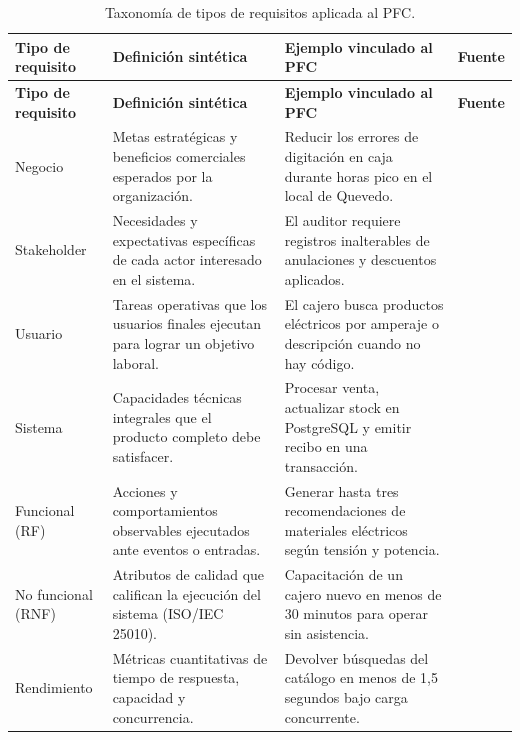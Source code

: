 \documentclass[onecolumn,12pt,a4paper]{IEEEtran}
\begin{document}
	\begin{longtable}{>{\raggedright\arraybackslash}p{2.6cm} >{\raggedright\arraybackslash}p{5.2cm} >{\raggedright\arraybackslash}p{5.2cm} >{\raggedright\arraybackslash}p{2.0cm}}
		\caption{Taxonom\'ia de tipos de requisitos aplicada al PFC.}
		\label{tab:tipos_req}\\
		\toprule
		\textbf{Tipo de requisito} & \textbf{Definici\'on sint\'etica} & \textbf{Ejemplo vinculado al PFC} & \textbf{Fuente} \\
		\midrule
		\endfirsthead
		\toprule
		\textbf{Tipo de requisito} & \textbf{Definici\'on sint\'etica} & \textbf{Ejemplo vinculado al PFC} & \textbf{Fuente} \\
		\midrule
		\endhead
		\bottomrule
		\endfoot
		Negocio & Metas estrat\'egicas y beneficios comerciales esperados por la organizaci\'on. & Reducir los errores de digitaci\'on en caja durante horas pico en el local de Quevedo. & \cite{iso29148,wiegers2013} \\
		\midrule
		Stakeholder & Necesidades y expectativas espec\'ificas de cada actor interesado en el sistema. & El auditor requiere registros inalterables de anulaciones y descuentos aplicados. & \cite{iso29148,pmbok7} \\
		\midrule
		Usuario & Tareas operativas que los usuarios finales ejecutan para lograr un objetivo laboral. & El cajero busca productos el\'ectricos por amperaje o descripci\'on cuando no hay c\'odigo. & \cite{iso29148,ireb2023} \\
		\midrule
		Sistema & Capacidades t\'ecnicas integrales que el producto completo debe satisfacer. & Procesar venta, actualizar stock en PostgreSQL y emitir recibo en una transacci\'on. & \cite{iso29148,iso15288} \\
		\midrule
		Funcional (RF) & Acciones y comportamientos observables ejecutados ante eventos o entradas. & Generar hasta tres recomendaciones de materiales el\'ectricos seg\'un tensi\'on y potencia. & \cite{iso29148,pohl2025,mavin2009} \\
		\midrule
		No funcional (RNF) & Atributos de calidad que califican la ejecuci\'on del sistema (ISO/IEC 25010). & Capacitaci\'on de un cajero nuevo en menos de 30 minutos para operar sin asistencia. & \cite{iso25010,pohl2025,glinz2007} \\
		\midrule
		Rendimiento & M\'etricas cuantitativas de tiempo de respuesta, capacidad y concurrencia. & Devolver b\'usquedas del cat\'alogo en menos de 1,5 segundos bajo carga concurrente. & \cite{iso29148,iso25010} \\

\end{longtable}
\end{document}
